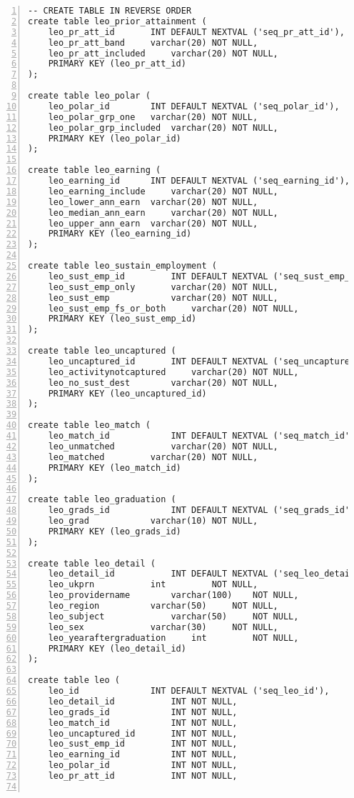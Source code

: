\begin{lstlisting}[breaklines, frame=single, numbers=left, caption={PL/pgSQL's DDL scripts for Education Normalized Table Creation.}, label=commandline-02]
-- CREATE TABLE IN REVERSE ORDER 
create table leo_prior_attainment (
	leo_pr_att_id 		INT DEFAULT NEXTVAL ('seq_pr_att_id'),
	leo_pr_att_band 	varchar(20) NOT NULL, 
	leo_pr_att_included 	varchar(20) NOT NULL, 
	PRIMARY KEY (leo_pr_att_id)
);

create table leo_polar (
	leo_polar_id 		INT DEFAULT NEXTVAL ('seq_polar_id'),
	leo_polar_grp_one 	varchar(20) NOT NULL, 
	leo_polar_grp_included 	varchar(20) NOT NULL, 
	PRIMARY KEY (leo_polar_id)
);

create table leo_earning (
	leo_earning_id 		INT DEFAULT NEXTVAL ('seq_earning_id'), 
	leo_earning_include 	varchar(20) NOT NULL, 
	leo_lower_ann_earn 	varchar(20) NOT NULL, 
	leo_median_ann_earn 	varchar(20) NOT NULL, 
	leo_upper_ann_earn 	varchar(20) NOT NULL,
	PRIMARY KEY (leo_earning_id) 
);

create table leo_sustain_employment (
	leo_sust_emp_id 		INT DEFAULT NEXTVAL ('seq_sust_emp_id'), 
	leo_sust_emp_only 		varchar(20) NOT NULL, 
	leo_sust_emp	 		varchar(20) NOT NULL, 
	leo_sust_emp_fs_or_both 	varchar(20) NOT NULL, 
	PRIMARY KEY (leo_sust_emp_id) 
);

create table leo_uncaptured (
	leo_uncaptured_id 		INT DEFAULT NEXTVAL ('seq_uncaptured_id'), 
	leo_activitynotcaptured 	varchar(20) NOT NULL, 
	leo_no_sust_dest	 	varchar(20) NOT NULL,  
	PRIMARY KEY (leo_uncaptured_id) 
);

create table leo_match (
	leo_match_id	 		INT DEFAULT NEXTVAL ('seq_match_id'), 
	leo_unmatched 			varchar(20) NOT NULL, 
	leo_matched	 		varchar(20) NOT NULL,
	PRIMARY KEY (leo_match_id)
);

create table leo_graduation (
	leo_grads_id	 		INT DEFAULT NEXTVAL ('seq_grads_id'), 
	leo_grad 			varchar(10) NOT NULL, 
	PRIMARY KEY (leo_grads_id) 
);

create table leo_detail (
	leo_detail_id		 	INT DEFAULT NEXTVAL ('seq_leo_detail_id'), 
	leo_ukprn 			int 		NOT NULL, 
	leo_providername 		varchar(100) 	NOT NULL, 
	leo_region 			varchar(50) 	NOT NULL, 
	leo_subject 			varchar(50) 	NOT NULL, 
	leo_sex 			varchar(30) 	NOT NULL, 
	leo_yearaftergraduation		int 		NOT NULL, 
	PRIMARY KEY (leo_detail_id)
);

create table leo (
	leo_id				INT DEFAULT NEXTVAL ('seq_leo_id'),
	leo_detail_id 			INT NOT NULL,
	leo_grads_id 			INT NOT NULL,
	leo_match_id 			INT NOT NULL,
	leo_uncaptured_id		INT NOT NULL, 
	leo_sust_emp_id 		INT NOT NULL,
	leo_earning_id			INT NOT NULL,
	leo_polar_id			INT NOT NULL,
	leo_pr_att_id			INT NOT NULL,
	

\end{lstlisting}
